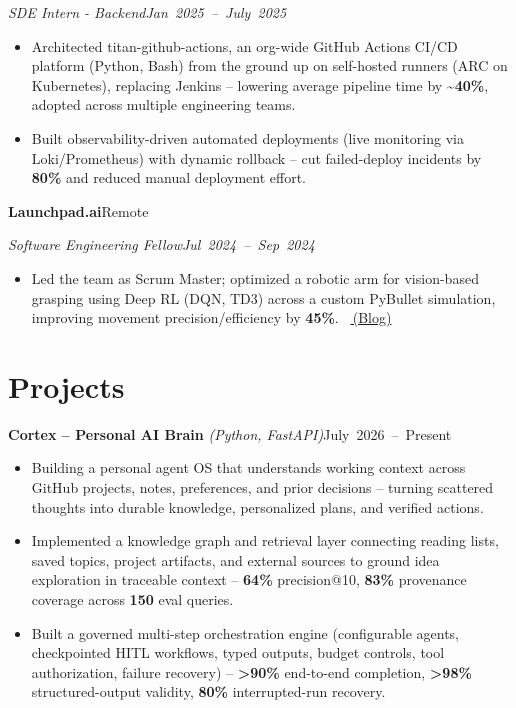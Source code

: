 \documentclass[10pt,letterpaper]{article}
\newcommand{\resumeHeading}[4]{%
  \par\noindent\textbf{#1}\hfill\mbox{#2}\par
  \noindent\textit{#3}\hfill\mbox{\textit{#4}}\par
}
\newcommand{\projectHeading}[3]{%
  \par\noindent\textbf{#1} \textit{(#2)}\hfill\mbox{#3}\par
}
\begin{document}
\noindent\textit{SDE Intern - Backend}\hfill\mbox{\textit{Jan 2025 -- July 2025}}\par
\begin{itemize}
\item Architected titan-github-actions, an org-wide GitHub Actions CI/CD platform (Python, Bash) from the ground up on self-hosted runners (ARC on Kubernetes), replacing Jenkins -- lowering average pipeline time by \textbf{\textasciitilde 40\%}, adopted across multiple engineering teams.
\item Built observability-driven automated deployments (live monitoring via Loki/Prometheus) with dynamic rollback -- cut failed-deploy incidents by \textbf{80\%} and reduced manual deployment effort.
\end{itemize}

\resumeHeading{Launchpad.ai}{Remote}{Software Engineering Fellow}{Jul 2024 -- Sep 2024}
\begin{itemize}
\item Led the team as Scrum Master; optimized a robotic arm for vision-based grasping using Deep RL (DQN, TD3) across a custom PyBullet simulation, improving movement precision/efficiency by \textbf{45\%}. \textbar\ \href{https://medium.com/@gauthamsathyan/automating-sunscreen-application-with-robotics-a-deep-dive-into-two-approaches-34304dbdd719}{\textnormal{{\faExternalLink}\,\normalsize (Blog)}}
\end{itemize}

\section{Projects}
\projectHeading{Cortex -- Personal AI Brain}{Python, FastAPI}{\scriptsize\normalsize July 2026 -- Present}
\begin{itemize}
  \item Building a personal agent OS that understands working context across GitHub projects, notes, preferences, and prior decisions -- turning scattered thoughts into durable knowledge, personalized plans, and verified actions.
  \item Implemented a knowledge graph and retrieval layer connecting reading lists, saved topics, project artifacts, and external sources to ground idea exploration in traceable context -- \textbf{64\%} precision@10, \textbf{83\%} provenance coverage across \textbf{150} eval queries.
  \item Built a governed multi-step orchestration engine (configurable agents, checkpointed HITL workflows, typed outputs, budget controls, tool authorization, failure recovery) -- \textbf{>90\%} end-to-end completion, \textbf{>98\%} structured-output validity, \textbf{80\%} interrupted-run recovery.
\end{itemize}
\end{document}

